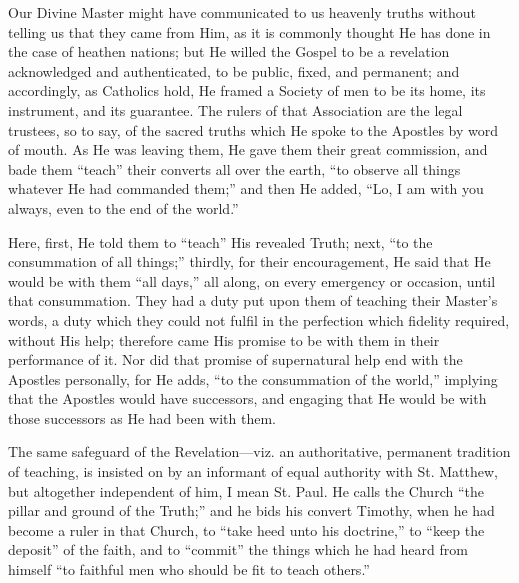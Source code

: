 Our Divine Master might have communicated to us heavenly truths
without telling us that they came from Him, as it is commonly thought He
has done in the case of heathen nations; but He willed the Gospel to be
a revelation acknowledged and authenticated, to be public, fixed, and
permanent; and accordingly, as Catholics hold, He framed a Society of
men to be its home, its instrument, and its guarantee. The rulers of
that Association are the legal trustees, so to say, of the sacred truths
which He spoke to the Apostles by word of mouth. As He was leaving them,
He gave them their great commission, and bade them ``teach''
their converts all over the earth, ``to observe all things whatever
He had commanded them;'' and then He added, ``Lo, I am with you
always, even to the end of the world.''

Here, first, He told them to ``teach'' His revealed Truth;
next, ``to the consummation of all things;'' thirdly, for their
encouragement, He said that He would be with them ``all days,''
all along, on every emergency or occasion, until that consummation. They
had a duty put upon them of teaching their Master's words, a duty which
they could not fulfil in the perfection which fidelity required, without
His help; therefore came His promise to be with them in their
performance of it. Nor did that promise of supernatural help end with
the Apostles personally, for He adds, ``to the consummation of the
world,'' implying that the Apostles would have successors, and
engaging that He would be with those successors as He had been with
them.

The same safeguard of the Revelation—viz. an authoritative,
permanent tradition of teaching, is insisted on by an informant of equal
authority with St. Matthew, but altogether independent of him, I mean
St. Paul. He calls the Church ``the pillar and ground of the
Truth;'' and he bids his convert Timothy, when he had become a ruler
in that Church, to ``take heed unto his doctrine,'' to
``keep the deposit'' of the faith, and to ``commit'' the
things which he had heard from himself ``to faithful men who should
be fit to teach others.''

